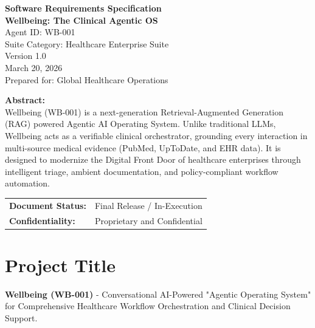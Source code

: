 \documentclass[12pt,a4paper]{article}
\begin{document}
\begin{titlepage}
    \centering\vspace*{1.5cm}
    {\Huge\bfseries\color{wellbeingblue} Software Requirements Specification}\\[0.5cm]
    {\Huge\bfseries\color{wellbeingblue} Wellbeing: The Clinical Agentic OS}\\[1cm]
    {\Large Agent ID: WB-001}\\[0.3cm]
    {\Large Suite Category: Healthcare Enterprise Suite}\\[0.3cm]
    {\Large Version 1.0}\\[0.3cm]
    {\Large March 20, 2026}\\[1cm]
    {\Large Prepared for: Global Healthcare Operations}\\[2cm]

    \begin{mdframed}[backgroundcolor=lightgray, linecolor=wellbeingblue, linewidth=1.5pt, roundcorner=5pt]
        \centering\vspace{0.4cm}
        \textbf{Abstract:}\\[0.2cm]
        Wellbeing (WB-001) is a next-generation Retrieval-Augmented Generation (RAG) powered Agentic AI Operating System. Unlike traditional LLMs, Wellbeing acts as a verifiable clinical orchestrator, grounding every interaction in multi-source medical evidence (PubMed, UpToDate, and EHR data). It is designed to modernize the Digital Front Door of healthcare enterprises through intelligent triage, ambient documentation, and policy-compliant workflow automation.
        \vspace{0.4cm}
    \end{mdframed}
    
    \vfill
    \begin{tabular}{ll}
        \textbf{Document Status:} & Final Release / In-Execution \\
        \textbf{Confidentiality:} & Proprietary and Confidential \\
    \end{tabular}
\end{titlepage}

\newpage
\tableofcontents
\newpage

\section{Project Title}
\textbf{Wellbeing (WB-001)} - Conversational AI-Powered "Agentic Operating System" for Comprehensive Healthcare Workflow Orchestration and Clinical Decision Support.
\end{document}
